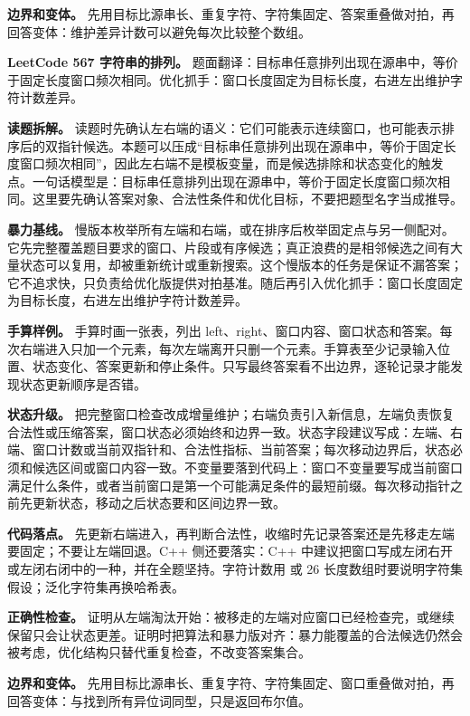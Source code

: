 \textbf{边界和变体。} 先用目标比源串长、重复字符、字符集固定、答案重叠做对拍，再回答变体：维护差异计数可以避免每次比较整个数组。

\noindent\textbf{LeetCode 567 字符串的排列。} 题面翻译：目标串任意排列出现在源串中，等价于固定长度窗口频次相同。优化抓手：窗口长度固定为目标长度，右进左出维护字符计数差异。

\textbf{读题拆解。} 读题时先确认左右端的语义：它们可能表示连续窗口，也可能表示排序后的双指针候选。本题可以压成“目标串任意排列出现在源串中，等价于固定长度窗口频次相同”，因此左右端不是模板变量，而是候选排除和状态变化的触发点。一句话模型是：目标串任意排列出现在源串中，等价于固定长度窗口频次相同。这里要先确认答案对象、合法性条件和优化目标，不要把题型名字当成推导。

\textbf{暴力基线。} 慢版本枚举所有左端和右端，或在排序后枚举固定点与另一侧配对。它先完整覆盖题目要求的窗口、片段或有序候选；真正浪费的是相邻候选之间有大量状态可以复用，却被重新统计或重新搜索。这个慢版本的任务是保证不漏答案；它不追求快，只负责给优化版提供对拍基准。随后再引入优化抓手：窗口长度固定为目标长度，右进左出维护字符计数差异。

\textbf{手算样例。} 手算时画一张表，列出 left、right、窗口内容、窗口状态和答案。每次右端进入只加一个元素，每次左端离开只删一个元素。手算表至少记录输入位置、状态变化、答案更新和停止条件。只写最终答案看不出边界，逐轮记录才能发现状态更新顺序是否错。

\textbf{状态升级。} 把完整窗口检查改成增量维护；右端负责引入新信息，左端负责恢复合法性或压缩答案，窗口状态必须始终和边界一致。状态字段建议写成：左端、右端、窗口计数或当前双指针和、合法性指标、当前答案；每次移动边界后，状态必须和候选区间或窗口内容一致。不变量要落到代码上：窗口不变量要写成当前窗口满足什么条件，或者当前窗口是第一个可能满足条件的最短前缀。每次移动指针之前先更新状态，移动之后状态要和区间边界一致。

\textbf{代码落点。} 先更新右端进入，再判断合法性，收缩时先记录答案还是先移走左端要固定；不要让左端回退。C++ 侧还要落实：C++ 中建议把窗口写成左闭右开或左闭右闭中的一种，并在全题坚持。字符计数用  或 26 长度数组时要说明字符集假设；泛化字符集再换哈希表。

\textbf{正确性检查。} 证明从左端淘汰开始：被移走的左端对应窗口已经检查完，或继续保留只会让状态更差。证明时把算法和暴力版对齐：暴力能覆盖的合法候选仍然会被考虑，优化结构只替代重复检查，不改变答案集合。

\textbf{边界和变体。} 先用目标比源串长、重复字符、字符集固定、窗口重叠做对拍，再回答变体：与找到所有异位词同型，只是返回布尔值。

